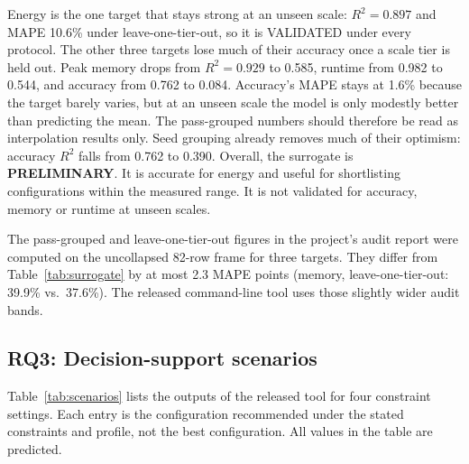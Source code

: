 \documentclass[conference]{IEEEtran}
\begin{document}
Energy is the one target that stays strong at an unseen scale: $R^2=0.897$ and MAPE 10.6\%
under leave-one-tier-out, so it is VALIDATED under every protocol. The other three targets
lose much of their accuracy once a scale tier is held out. Peak memory drops from
$R^2=0.929$ to 0.585, runtime from 0.982 to 0.544, and accuracy from 0.762 to 0.084.
Accuracy's MAPE stays at 1.6\% because the target barely varies, but at an unseen scale the
model is only modestly better than predicting the mean. The pass-grouped numbers should
therefore be read as interpolation results only. Seed grouping already removes much of their
optimism: accuracy $R^2$ falls from 0.762 to 0.390. Overall, the surrogate is
\textbf{PRELIMINARY}. It is accurate for energy and useful for shortlisting configurations
within the measured range. It is not validated for accuracy, memory or runtime at unseen
scales. %

The pass-grouped and leave-one-tier-out figures in the project's audit report were computed
on the uncollapsed 82-row frame for three targets. They differ from Table~\ref{tab:surrogate}
by at most 2.3 MAPE points (memory, leave-one-tier-out: 39.9\% vs.\ 37.6\%). The released
command-line tool uses those slightly wider audit bands. %

\subsection{RQ3: Decision-support scenarios}

Table~\ref{tab:scenarios} lists the outputs of the released tool for four constraint
settings. Each entry is the configuration recommended under the stated constraints and
profile, not the best configuration. All values in the table are predicted.
\end{document}
